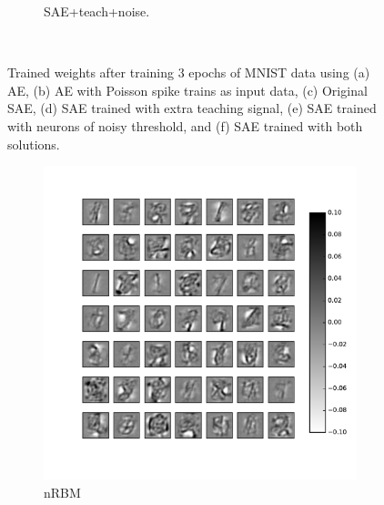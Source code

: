 \begin{figure}
\begin{subfigure}[t]{0.4\textwidth}
		\caption{SAE+teach+noise.}
	\end{subfigure}\\
	\caption{Trained weights after training 3 epochs of MNIST data using (a) AE, (b) AE with Poisson spike trains as input data, (c) Original SAE, (d) SAE trained with extra teaching signal, (e) SAE trained with neurons of noisy threshold, and (f) SAE trained with both solutions.}
\end{figure}

\begin{figure}
	\centering
	\begin{subfigure}[t]{0.4\textwidth}
		\includegraphics[width=\textwidth]{pics_sdlm/32_MNIST_RBM/2_60000_0.pdf}
		\caption{nRBM}
	\end{subfigure}
	\begin{subfigure}[t]{0.4\textwidth}

\end{subfigure}
\end{figure}
